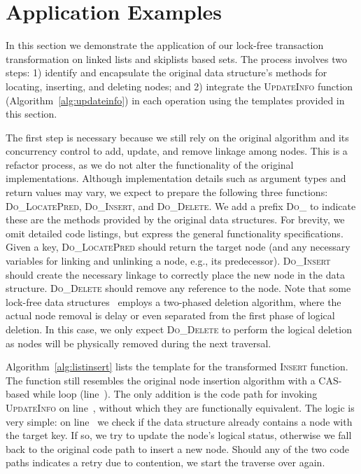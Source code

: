 \documentclass[10pt,conference,compsocconf]{IEEEtran}
\begin{document}
\section{Application Examples}
\label{sec:application}
In this section we demonstrate the application of our lock-free transaction transformation on linked lists and skiplists based sets. 
The process involves two steps: 1) identify and encapsulate the original data structure's methods for locating, inserting, and deleting nodes; and 2) integrate the \textsc{UpdateInfo} function (Algorithm~\ref{alg:updateinfo}) in each operation using the templates provided in this section.

The first step is necessary because we still rely on the original algorithm and its concurrency control to add, update, and remove linkage among nodes.
This is a refactor process, as we do not alter the functionality of the original implementations. 
Although implementation details such as argument types and return values may vary, we expect to prepare the following three functions: \textsc{Do\_LocatePred}, \textsc{Do\_Insert}, and \textsc{Do\_Delete}.
We add a prefix \textsc{Do\_} to indicate these are the methods provided by the original data structures.
For brevity, we omit detailed code listings, but express the general functionality specifications.
Given a key, \textsc{Do\_LocatePred} should return the target node (and any necessary variables for linking and unlinking a node, e.g., its predecessor).
\textsc{Do\_Insert} should create the necessary linkage to correctly place the new node in the data structure.
\textsc{Do\_Delete} should remove any reference to the node.
Note that some lock-free data structures~\cite{harris2001pragmatic,fraser2004practical} employs a two-phased deletion algorithm, where the actual node removal is delay or even separated from the first phase of logical deletion.
In this case, we only expect \textsc{Do\_Delete} to perform the logical deletion as nodes will be physically removed during the next traversal.


Algorithm~\ref{alg:listinsert} lists the template for the transformed \textsc{Insert} function.
The function still resembles the original node insertion algorithm with a CAS-based while loop (line~).
The only addition is the code path for invoking \textsc{UpdateInfo} on line~, without which they are functionally equivalent.
The logic is very simple: on line~ we check if the data structure already contains a node with the target key.
If so, we try to update the node's logical status, otherwise we fall back to the original code path to insert a new node. 
Should any of the two code paths indicates a retry due to contention, we start the traverse over again.
\end{document}
